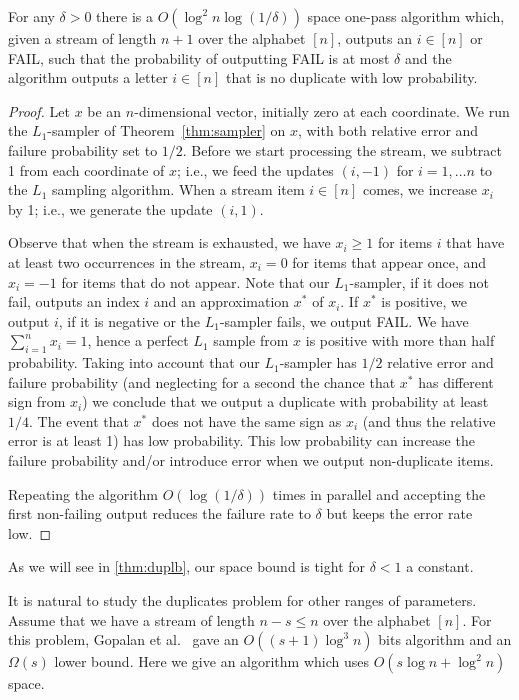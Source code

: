\begin{theorem}\label{thm:dupub}
For any $\delta>0$ there is a $O(\log^2 n\log(1/\delta))$ space one-pass
algorithm which, given a stream of length $n+1$ over the alphabet $[n]$,
outputs an $i\in[n]$ or FAIL, such that the probability of outputting FAIL
is at most $\delta$ and the algorithm outputs a letter $i\in[n]$ that is no
duplicate with low probability.
\end{theorem}
\begin{proof}
Let $x$ be an $n$-dimensional vector, initially zero at each coordinate. We
run the $L_1$-sampler of Theorem~\ref{thm:sampler} on $x$, with both relative error
and failure probability set to $1/2$. Before we start processing the
stream, we subtract 1 from each coordinate of $x$; i.e., we feed the updates
$(i,-1)$ for $i=1,\ldots n$ to the $L_1$ sampling algorithm. When a stream
item $i\in [n]$ comes, we increase $x_i$ by 1; i.e., we generate the update
$(i,1)$.

Observe that when the stream is exhausted, we have $x_i\geq 1$ for items $i$
that have at least two occurrences in the stream, $x_i=0$ for items that
appear once, and $x_i=-1$ for items that do not appear.  Note that our
$L_1$-sampler, if it does not fail, outputs an index $i$ and an approximation
$x^*$ of $x_i$. If $x^*$ is positive, we output $i$, if it is
negative or the $L_1$-sampler fails, we output FAIL. We have
$\sum_{i=1}^nx_i=1$,  hence a perfect $L_1$ sample from $x$ is positive with
more than half probability. Taking into account that our $L_1$-sampler has
$1/2$ relative error and failure probability (and neglecting for a second the
chance that $x^*$ has different sign from $x_i$) we conclude that we output a
duplicate with probability at least $1/4$. The event that $x^*$ does not have
the same sign as $x_i$ (and thus the relative error is at least 1) has low
probability. This low probability can increase the failure probability and/or
introduce error when we output non-duplicate items.

Repeating the algorithm $O(\log(1/\delta))$ times in parallel and accepting
the first non-failing output reduces the failure rate to
$\delta$ but keeps the error rate low.
\end{proof}

As we will see in \autoref{thm:duplb}, our space bound is tight for
$\delta<1$ a constant. 

It is natural to study the duplicates problem for other ranges of
parameters. Assume that we have a stream of length $n-s\le n$ over the
alphabet $[n]$. For this problem, Gopalan et al.\ \cite{GopalanR2009} gave
an $O((s+1)\log^3 n)$ bits algorithm and an $\Omega(s)$ lower bound. Here we
give an algorithm which uses $O(s\log n+\log^2 n)$ space.

